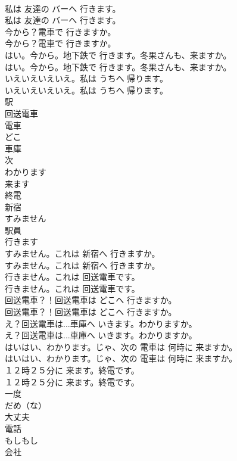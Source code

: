 \documentclass[8pt]{extreport}
\begin{document}
\begin{CJK}{UTF8}{min}
\\	私は 友達の バーへ 行きます。	
\\	私は 友達の バーへ 行きます。 
\\	今から？電車で 行きますか。	
\\	今から？電車で 行きますか。 
\\	はい。今から。地下鉄で 行きます。冬果さんも、来ますか。	
\\	はい。今から。地下鉄で 行きます。冬果さんも、来ますか。 
\\	いえいえいえいえ。私は うちへ 帰ります。	
\\	いえいえいえいえ。私は うちへ 帰ります。 
\\	駅
\\	回送電車
\\	電車
\\	どこ
\\	車庫
\\	次
\\	わかります
\\	来ます
\\	終電
\\	新宿
\\	すみません
\\	駅員
\\	行きます
\\	すみません。これは 新宿へ 行きますか。	
\\	すみません。これは 新宿へ 行きますか。 
\\	行きません。これは 回送電車です。	
\\	行きません。これは 回送電車です。 
\\	回送電車？！回送電車は どこへ 行きますか。	
\\	回送電車？！回送電車は どこへ 行きますか。 
\\	え？回送電車は...車庫へ いきます。わかりますか。	
\\	え？回送電車は...車庫へ いきます。わかりますか。 
\\	はいはい、わかります。じゃ、次の 電車は 何時に 来ますか。	
\\	はいはい、わかります。じゃ、次の 電車は 何時に 来ますか。 
\\	１２時２５分に 来ます。終電です。	
\\	１２時２５分に 来ます。終電です。 
\\	一度
\\	だめ（な）
\\	大丈夫
\\	電話
\\	もしもし
\\	会社

\end{CJK}
\end{document}
